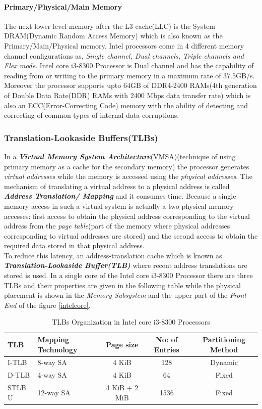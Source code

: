 \documentclass[a4paper,11pt]{article}
\begin{document}
\paragraph{Primary/Physical/Main Memory}
The next lower level memory after the L3 cache(LLC) is the System DRAM(Dynamic Random Access Memory) which is also known as the Primary/Main/Physical memory. Intel processors come in 4 different memory channel configurations as, \textit{Single channel, Dual channels, Triple channels and Flex mode}. Intel core i3-8300 Processor is Dual channel and has the capability of reading from or writing to the primary memory in a maximum rate of  37.5GB/s. Moreover the processor supports upto 64GB of DDR4-2400 RAMs(4th generation of Double Data Rate(DDR) RAMs with 2400 Mbps data transfer rate) which is also an ECC(Error-Correcting Code) memory with the ability of detecting and correcting of common types of internal data corruptions.

\subsubsection{Translation-Lookaside Buffers(TLBs)}
In a \textit{\textbf{Virtual Memory System Architecture}}(VMSA)(technique of using primary memory as a cache for the secondary memory) the processor generates \textit{virtual addresses} while the memory is accessed using the \textit{physical addresses}. The mechanism of translating a virtual address to a physical address is called \textbf{\textit{Address Translation/ Mapping}} and it consumes time. Because a single memory access in such a virtual system is actually a two physical memory accesses: first access to obtain the physical address corresponding to the virtual address from the \textit{page table}(part of the memory where physical addresses corresponding to virtual addresses are stored) and the second access to obtain the required data stored in that physical address.\\

To reduce this latency, an address-translation cache which is known as \textbf{\textit{Translation-Lookaside Buffer(TLB)}} where recent address translations are stored is used. In a single core of the Intel core i3-8300 Processor there are three TLBs and their properties are given in the following table while the physical placement is shown in the \textit{Memory Subsystem} and the upper part of the \textit{Front End} of the figure \ref{intelcore}.


\begin{table}[!h]
	\centering
	\begin{tabular}{l |l| c| c| c}
		TLB  & Mapping Technology & Page size & No: of Entries& Partitioning Method\\
		\hline
		I-TLB & 8-way SA & 4 KiB& 128 &Dynamic\\
		D-TLB &  4-way SA & 4 KiB &64 &Fixed\\
		STLB U & 12-way SA&  4 KiB + 2 MiB & 1536 & Fixed\\
		\hline\hline
	\end{tabular}
	\caption{TLBs Organization in Intel core i3-8300 Processors}
\end{table}
\end{document}
